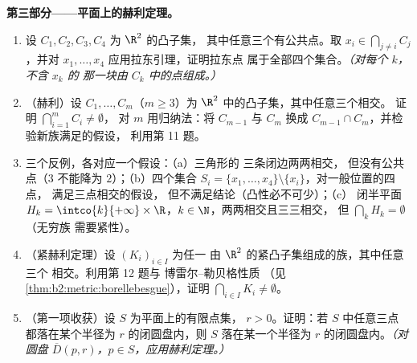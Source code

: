 \begin{problem}
\medskip
\noindent\textbf{第三部分——平面上的赫利定理。}
\begin{enumerate}[resume]
  \item 设 $C_1, C_2, C_3, C_4$ 为 $\R^2$ 的凸子集，
        其中任意三个有公共点。取 $x_i \in
        \bigcap_{j \neq i} C_j$，并对
        $x_1, \dots, x_4$ 应用拉东引理，证明拉东点
        属于全部四个集合。\emph{（对每个 $k$，不含 $x_k$ 的
        那一块由 $C_k$ 中的点组成。）}
  \item （赫利）设 $C_1, \dots, C_m$（$m \geq 3$）为
        $\R^2$ 中的凸子集，其中任意三个相交。
        证明 $\bigcap_{i=1}^m C_i \neq \emptyset$，
        对 $m$ 用归纳法：将 $C_{m-1}$ 与 $C_m$ 换成
        $C_{m-1} \cap C_m$，并检验新族满足的假设，
        利用第 11 题。
  \item 三个反例，各对应一个假设：（a）三角形的
        三条闭边两两相交，
        但没有公共点（$3$ 不能降为
        $2$）；（b）四个集合 $S_i = \{x_1, \dots, x_4\}
        \setminus \{x_i\}$，对一般位置的四点，
        满足三点相交的假设，
        但不满足结论（凸性必不可少）；（c）
        闭半平面 $H_k = \intco{k}{+\infty} \times
        \R$，$k \in \N$，两两相交且三三相交，
        但 $\bigcap_k H_k = \emptyset$（无穷族
        需要紧性）。
  \item （紧赫利定理）设 $(K_i)_{i \in I}$ 为任一
        由 $\R^2$ 的紧凸子集组成的族，其中任意三个
        相交。利用第 12 题与
        博雷尔–勒贝格性质
        （见\cref{thm:b2:metric:borellebesgue}），证明
        $\bigcap_{i \in I} K_i \neq \emptyset$。
  \item （第一项收获）设 $S$ 为平面上的有限点集，
        $r > 0$。证明：若 $S$ 中任意三点
        都落在某个半径为 $r$ 的闭圆盘内，则 $S$
        落在某一个半径为 $r$ 的闭圆盘内。\emph{（对圆盘
        $\overline D(p, r)$，$p \in S$，应用赫利定理。）}
\end{enumerate}


\end{problem}
